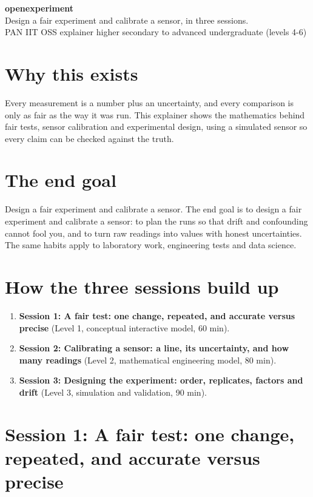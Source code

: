 \documentclass[11pt,a4paper]{article}
\begin{document}
\begin{center}{\LARGE\bfseries openexperiment}\\[0.4em]{\large Design a fair experiment and calibrate a sensor, in three sessions.}\\[0.2em]\small PAN IIT OSS explainer \textbullet{} higher secondary to advanced undergraduate (levels 4-6)\end{center}

\section*{Why this exists}
Every measurement is a number plus an uncertainty, and every comparison is only as fair as the way it was run. This explainer shows the mathematics behind fair tests, sensor calibration and experimental design, using a simulated sensor so every claim can be checked against the truth.

\section*{The end goal}
Design a fair experiment and calibrate a sensor. The end goal is to design a fair experiment and calibrate a sensor: to plan the runs so that drift and confounding cannot fool you, and to turn raw readings into values with honest uncertainties. The same habits apply to laboratory work, engineering tests and data science.

\section*{How the three sessions build up}
\begin{enumerate}[nosep]
\item \textbf{Session 1: A fair test: one change, repeated, and accurate versus precise} (Level 1, conceptual interactive model, 60 min).
\item \textbf{Session 2: Calibrating a sensor: a line, its uncertainty, and how many readings} (Level 2, mathematical engineering model, 80 min).
\item \textbf{Session 3: Designing the experiment: order, replicates, factors and drift} (Level 3, simulation and validation, 90 min).
\end{enumerate}

\section{Session 1: A fair test: one change, repeated, and accurate versus precise}
\end{document}

